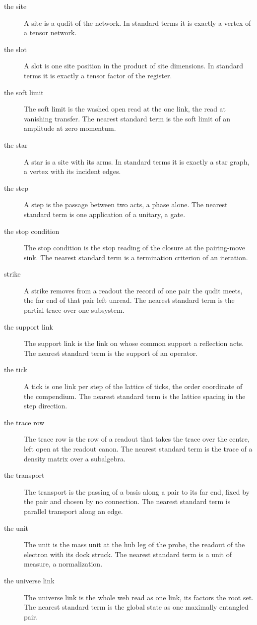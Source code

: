\begin{description}
\item[the site] A site is a qudit of the network. In standard terms it is exactly a vertex of a tensor network.
\item[the slot] A slot is one site position in the product of site dimensions. In standard terms it is exactly a tensor factor of the register.
\item[the soft limit] The soft limit is the washed open read at the one link, the read at vanishing transfer. The nearest standard term is the soft limit of an amplitude at zero momentum.
\item[the star] A star is a site with its arms. In standard terms it is exactly a star graph, a vertex with its incident edges.
\item[the step] A step is the passage between two acts, a phase alone. The nearest standard term is one application of a unitary, a gate.
\item[the stop condition] The stop condition is the stop reading of the closure at the pairing-move sink. The nearest standard term is a termination criterion of an iteration.
\item[strike] A strike removes from a readout the record of one pair the qudit meets, the far end of that pair left unread. The nearest standard term is the partial trace over one subsystem.
\item[the support link] The support link is the link on whose common support a reflection acts. The nearest standard term is the support of an operator.
\item[the tick] A tick is one link per step of the lattice of ticks, the order coordinate of the compendium. The nearest standard term is the lattice spacing in the step direction.
\item[the trace row] The trace row is the row of a readout that takes the trace over the centre, left open at the readout canon. The nearest standard term is the trace of a density matrix over a subalgebra.
\item[the transport] The transport is the passing of a basis along a pair to its far end, fixed by the pair and chosen by no connection. The nearest standard term is parallel transport along an edge.
\item[the unit] The unit is the mass unit at the hub leg of the probe, the readout of the electron with its dock struck. The nearest standard term is a unit of measure, a normalization.
\item[the universe link] The universe link is the whole web read as one link, its factors the root set. The nearest standard term is the global state as one maximally entangled pair.

\end{description}
